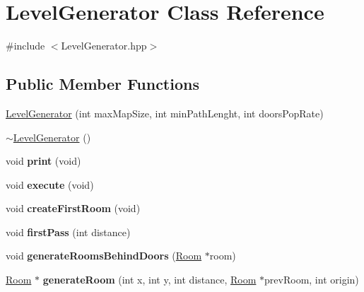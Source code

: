 \hypertarget{class_level_generator}{\section{Level\+Generator Class Reference}
\label{class_level_generator}
}


{\ttfamily \#include $<$Level\+Generator.\+hpp$>$}

\subsection*{Public Member Functions}
\begin{DoxyCompactItemize}
\item 
\hyperlink{class_level_generator_ad509b6dd7dbfd144466315ce2c493513}{Level\+Generator} (int max\+Map\+Size, int min\+Path\+Lenght, int doors\+Pop\+Rate)
\item 
\hyperlink{class_level_generator_a9bd612e10a3d769537ba042a76c0cb5f}{$\sim$\+Level\+Generator} ()
\item 
\hypertarget{class_level_generator_ad3a873efd53cec998e5b3cbec90b1e6d}{void {\bfseries print} (void)}\label{class_level_generator_ad3a873efd53cec998e5b3cbec90b1e6d}

\item 
\hypertarget{class_level_generator_aabdbf98d1f6b41ef3f921c7c08bac691}{void {\bfseries execute} (void)}\label{class_level_generator_aabdbf98d1f6b41ef3f921c7c08bac691}

\item 
\hypertarget{class_level_generator_a3a3c144dfccee44c67f42da9ad77ca93}{void {\bfseries create\+First\+Room} (void)}\label{class_level_generator_a3a3c144dfccee44c67f42da9ad77ca93}

\item 
\hypertarget{class_level_generator_a1f333c183a88620a11fa542067408184}{void {\bfseries first\+Pass} (int distance)}\label{class_level_generator_a1f333c183a88620a11fa542067408184}

\item 
\hypertarget{class_level_generator_a9d352262bacb1e8505ed1f2c76266555}{void {\bfseries generate\+Rooms\+Behind\+Doors} (\hyperlink{class_room}{Room} $\ast$room)}\label{class_level_generator_a9d352262bacb1e8505ed1f2c76266555}

\item 
\hypertarget{class_level_generator_aabd2f2b813e71976ce760304ddd401d6}{\hyperlink{class_room}{Room} $\ast$ {\bfseries generate\+Room} (int x, int y, int distance, \hyperlink{class_room}{Room} $\ast$prev\+Room, int origin)}\label{class_level_generator_aabd2f2b813e71976ce760304ddd401d6}


\end{DoxyCompactItemize}
